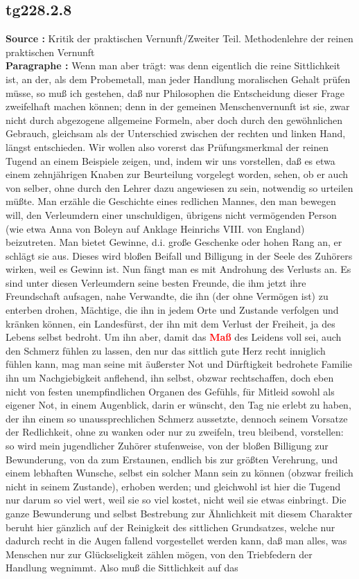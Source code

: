\documentclass[a4paper,12pt,twoside]{book}
\newcommand{\match}[1]{\textcolor{red}{\textbf{#1}}}
\begin{document}
	\subsection*{tg228.2.8} 
	\textbf{Source : }Kritik der praktischen Vernunft/Zweiter Teil. Methodenlehre der reinen praktischen Vernunft\\  
	
	\textbf{Paragraphe : }
	Wenn man aber trägt: was denn eigentlich die reine Sittlichkeit ist, an der, als dem Probemetall, man jeder Handlung moralischen Gehalt prüfen müsse, so muß ich gestehen, daß nur Philosophen die Entscheidung dieser Frage zweifelhaft machen können; denn in der gemeinen Menschenvernunft ist sie, zwar nicht durch abgezogene allgemeine Formeln, aber doch durch den gewöhnlichen Gebrauch, gleichsam als der Unterschied zwischen der rechten und linken Hand, längst entschieden. Wir wollen also vorerst das Prüfungsmerkmal der reinen Tugend an einem Beispiele zeigen, und, indem wir uns vorstellen, daß es etwa einem zehnjährigen Knaben zur Beurteilung vorgelegt worden, sehen, ob er auch von selber, ohne durch den Lehrer dazu angewiesen zu sein, notwendig so urteilen müßte. Man erzähle die Geschichte eines redlichen Mannes, den man bewegen will, den Verleumdern einer unschuldigen, übrigens nicht vermögenden Person (wie etwa Anna von Boleyn auf Anklage Heinrichs VIII. von England) beizutreten. Man bietet Gewinne, d.i. große Geschenke oder hohen Rang an, er schlägt sie aus. Dieses wird bloßen Beifall und Billigung in der Seele des Zuhörers wirken, weil es Gewinn ist. Nun fängt man es mit Androhung des Verlusts an. Es sind unter diesen Verleumdern seine besten Freunde, die ihm jetzt ihre Freundschaft aufsagen, nahe Verwandte, die ihn (der ohne Vermögen ist) zu enterben drohen, Mächtige, die ihn in jedem Orte und Zustande verfolgen und kränken können, ein Landesfürst, der ihn mit dem Verlust der Freiheit, ja des Lebens selbst bedroht. Um ihn aber, damit das \match{Maß} des Leidens voll sei, auch den Schmerz fühlen zu lassen, den nur  das sittlich gute Herz recht inniglich fühlen kann, mag man seine mit äußerster Not und Dürftigkeit bedrohete Familie ihn um Nachgiebigkeit anflehend, ihn selbst, obzwar rechtschaffen, doch eben nicht von festen unempfindlichen Organen des Gefühls, für Mitleid sowohl als eigener Not, in einem Augenblick, darin er wünscht, den Tag nie erlebt zu haben, der ihn einem so unaussprechlichen Schmerz aussetzte, dennoch seinem Vorsatze der Redlichkeit, ohne zu wanken oder nur zu zweifeln, treu bleibend, vorstellen: so wird mein jugendlicher Zuhörer stufenweise, von der bloßen Billigung zur Bewunderung, von da zum Erstaunen, endlich bis zur größten Verehrung, und einem lebhaften Wunsche, selbst ein solcher Mann sein zu können (obzwar freilich nicht in seinem Zustande), erhoben werden; und gleichwohl ist hier die Tugend nur darum so viel wert, weil sie so viel kostet, nicht weil sie etwas einbringt. Die ganze Bewunderung und selbst Bestrebung zur Ähnlichkeit mit diesem Charakter beruht hier gänzlich auf der Reinigkeit des sittlichen Grundsatzes, welche nur dadurch recht in die Augen fallend vorgestellet werden kann, daß man alles, was Menschen nur zur Glückseligkeit zählen mögen, von den Triebfedern der Handlung wegnimmt. Also muß die Sittlichkeit auf das 
\end{document}
